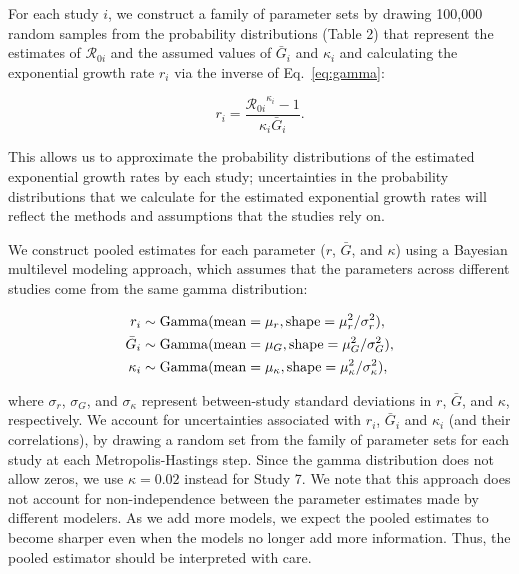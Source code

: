 \documentclass[12pt]{article}
\newcommand{\eref}[1]{Eq.~\ref{eq:#1}}
\newcommand{\Rx}[1]{\ensuremath{{\mathcal R}_{#1}}\xspace}
\begin{document}
For each study $i$, we construct a family of parameter sets by drawing 100,000 random samples from the probability distributions (Table 2) that represent the estimates of \Rx{0i} and the assumed values of $\bar G_i$ and $\kappa_i$ and calculating the exponential growth rate $r_i$ via the inverse of \eref{gamma}:
\begin{linenomath*}
\begin{equation}
r_i = \frac{\Rx{0i}^{\kappa_i} - 1}{\kappa_i \bar{G}_i}.
\end{equation}
\end{linenomath*}
This allows us to approximate the probability distributions of the estimated exponential growth rates by each study;
uncertainties in the probability distributions that we calculate for the estimated exponential growth rates will reflect the methods and assumptions that the studies rely on.

We construct pooled estimates for each parameter ($r$, $\bar G$, and $\kappa$) using a Bayesian multilevel modeling approach, which assumes that the parameters across different studies come from the same gamma distribution:
\begin{linenomath*}
\begin{equation}
\begin{aligned}
r_i &\sim \mathrm{Gamma}(\mathrm{mean}=\mu_r, \mathrm{shape}=\mu_r^2/\sigma_r^2),\\
\bar{G}_i &\sim \mathrm{Gamma}(\mathrm{mean}=\mu_G, \mathrm{shape}=\mu_G^2/\sigma_G^2),\\
\kappa_i &\sim \mathrm{Gamma}(\mathrm{mean}=\mu_\kappa, \mathrm{shape}=\mu_\kappa^2/\sigma_\kappa^2),\\
\end{aligned}
\end{equation}
\end{linenomath*}
where $\sigma_r$, $\sigma_G$, and $\sigma_\kappa$ represent between-study standard deviations in $r$, $\bar G$, and $\kappa$, respectively.
We account for uncertainties associated with $r_i$, $\bar G_i$ and $\kappa_i$ (and their correlations), by drawing a random set from the family of parameter sets for each study at each Metropolis-Hastings step.
Since the gamma distribution does not allow zeros, we use $\kappa=0.02$ instead for Study 7.
We note that this approach does not account for non-independence between the parameter estimates made by different modelers.
As we add more models, we expect the pooled estimates to become sharper even when the models no longer add more information.
Thus, the pooled estimator should be interpreted with care.
\end{document}
